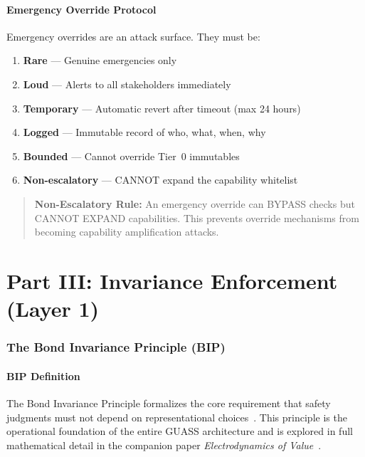 \documentclass[11pt,letterpaper]{article}
\theoremstyle{definition}
\theoremstyle{remark}
\begin{document}
\subsection{Emergency Override Protocol}

Emergency overrides are an attack surface. They must be:
\begin{enumerate}
\item \textbf{Rare} --- Genuine emergencies only
\item \textbf{Loud} --- Alerts to all stakeholders immediately
\item \textbf{Temporary} --- Automatic revert after timeout (max 24 hours)
\item \textbf{Logged} --- Immutable record of who, what, when, why
\item \textbf{Bounded} --- Cannot override Tier~0 immutables
\item \textbf{Non-escalatory} --- CANNOT expand the capability whitelist
\end{enumerate}

\begin{quote}
\textbf{Non-Escalatory Rule:} An emergency override can BYPASS checks but CANNOT EXPAND capabilities. This prevents override mechanisms from becoming capability amplification attacks.
\end{quote}



\part*{Part III: Invariance Enforcement (Layer 1)}

\section{The Bond Invariance Principle (BIP)}

\subsection{BIP Definition}

The Bond Invariance Principle formalizes the core requirement that safety judgments must not depend on representational choices~\cite{bond2025bip}. This principle is the operational foundation of the entire GUASS architecture and is explored in full mathematical detail in the companion paper \emph{Electrodynamics of Value}~\cite{bond2025eov}.
\end{document}
